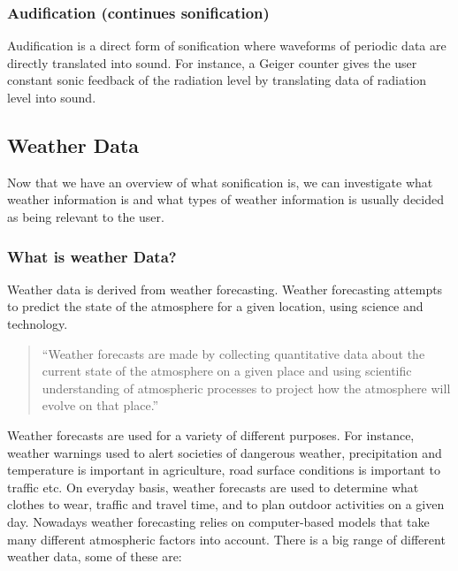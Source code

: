 

\subsubsection*{Audification (continues sonification)} %
\label{ssub:audification_continues_sonification_}

Audification is a direct form of sonification where waveforms of periodic data are directly translated into sound. 
For instance, a Geiger counter gives the user constant sonic feedback of the radiation level by translating data of radiation level into sound.




\subsection{Weather Data} %
\label{sub:weather_data}

Now that we have an overview of what sonification is, we can investigate what weather information is and what types of weather information is usually decided as being relevant to the user.


\subsubsection{What is weather Data?} %
\label{ssub:what_is_weather_data_}
Weather data is derived from weather forecasting. 
Weather forecasting attempts to predict the state of the atmosphere for a given location, using science and technology.

\begin{quote}
``Weather forecasts are made by collecting quantitative data about the current state of the atmosphere on a given place and using scientific understanding of atmospheric processes to project how the atmosphere will evolve on that place.'' \cite*{Wiki2014-1}
\end{quote}

Weather forecasts are used for a variety of different purposes. 
For instance, weather warnings used to alert societies of dangerous weather, precipitation and temperature is important in agriculture, road surface conditions is important to traffic etc.
On everyday basis, weather forecasts are used to determine what clothes to wear, traffic and travel time, and to plan outdoor activities on a given day. 
Nowadays weather forecasting relies on computer-based models that take many different atmospheric factors into account. 
There is a big range of different weather data, some of these are:

